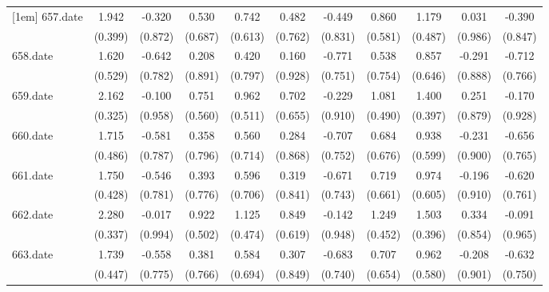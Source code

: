 \begin{tabular}{l*{10}{c}}
[1em]
657.date    &       1.942&      -0.320&       0.530&       0.742&       0.482&      -0.449&       0.860&       1.179&       0.031&      -0.390\\
            &     (0.399)&     (0.872)&     (0.687)&     (0.613)&     (0.762)&     (0.831)&     (0.581)&     (0.487)&     (0.986)&     (0.847)\\
[1em]
658.date    &       1.620&      -0.642&       0.208&       0.420&       0.160&      -0.771&       0.538&       0.857&      -0.291&      -0.712\\
            &     (0.529)&     (0.782)&     (0.891)&     (0.797)&     (0.928)&     (0.751)&     (0.754)&     (0.646)&     (0.888)&     (0.766)\\
[1em]
659.date    &       2.162&      -0.100&       0.751&       0.962&       0.702&      -0.229&       1.081&       1.400&       0.251&      -0.170\\
            &     (0.325)&     (0.958)&     (0.560)&     (0.511)&     (0.655)&     (0.910)&     (0.490)&     (0.397)&     (0.879)&     (0.928)\\
[1em]
660.date    &       1.715&      -0.581&       0.358&       0.560&       0.284&      -0.707&       0.684&       0.938&      -0.231&      -0.656\\
            &     (0.486)&     (0.787)&     (0.796)&     (0.714)&     (0.868)&     (0.752)&     (0.676)&     (0.599)&     (0.900)&     (0.765)\\
[1em]
661.date    &       1.750&      -0.546&       0.393&       0.596&       0.319&      -0.671&       0.719&       0.974&      -0.196&      -0.620\\
            &     (0.428)&     (0.781)&     (0.776)&     (0.706)&     (0.841)&     (0.743)&     (0.661)&     (0.605)&     (0.910)&     (0.761)\\
[1em]
662.date    &       2.280&      -0.017&       0.922&       1.125&       0.849&      -0.142&       1.249&       1.503&       0.334&      -0.091\\
            &     (0.337)&     (0.994)&     (0.502)&     (0.474)&     (0.619)&     (0.948)&     (0.452)&     (0.396)&     (0.854)&     (0.965)\\
[1em]
663.date    &       1.739&      -0.558&       0.381&       0.584&       0.307&      -0.683&       0.707&       0.962&      -0.208&      -0.632\\
            &     (0.447)&     (0.775)&     (0.766)&     (0.694)&     (0.849)&     (0.740)&     (0.654)&     (0.580)&     (0.901)&     (0.750)\\

\end{tabular}
